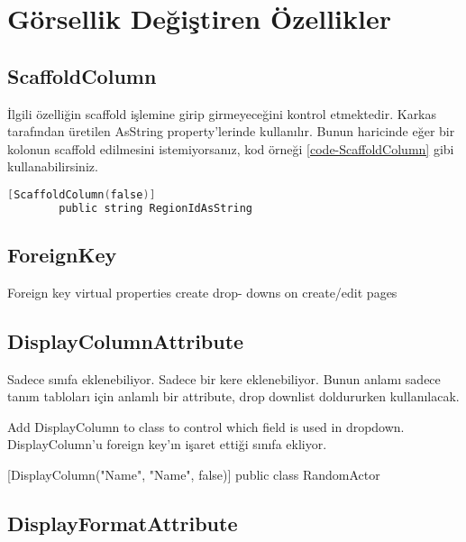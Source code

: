 \documentclass[10pt,a4paper]{article}
\begin{document}
\section{Görsellik Değiştiren Özellikler}


\subsection{ScaffoldColumn }
İlgili özelliğin scaffold işlemine girip girmeyeceğini kontrol etmektedir.
Karkas tarafından üretilen AsString property'lerinde kullanılır.
Bunun haricinde eğer bir kolonun scaffold edilmesini istemiyorsanız,
kod örneği \ref{code-ScaffoldColumn} gibi kullanabilirsiniz.




\begin{lstlisting}[label=code-ScaffoldColumn,caption=ScaffoldColumn,language=C]
		[ScaffoldColumn(false)]
		public string RegionIdAsString
\end{lstlisting}




\subsection{ForeignKey  }


		
Foreign key virtual properties create drop- downs on create/edit pages


\subsection{DisplayColumnAttribute}


Sadece sınıfa eklenebiliyor. Sadece bir kere eklenebiliyor. 
Bunun anlamı sadece tanım tabloları için anlamlı bir attribute, drop downlist doldururken kullanılacak.



Add DisplayColumn to class to control
which field is used in dropdown. DisplayColumn'u foreign key'ın işaret ettiği sınıfa ekliyor.

[DisplayColumn("Name", "Name", false)]
public class RandomActor


\subsection{DisplayFormatAttribute}
\end{document}
